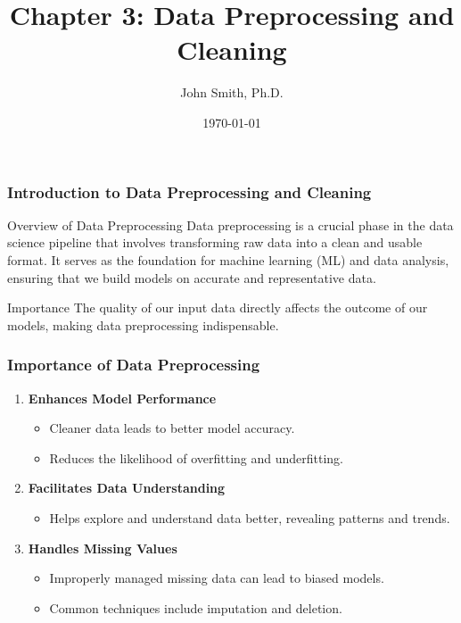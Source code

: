 \documentclass[aspectratio=169]{beamer}
\title[Chapter 3: Data Preprocessing and Cleaning]{Chapter 3: Data Preprocessing and Cleaning}
\author[J. Smith]{John Smith, Ph.D.}
\institute[University Name]{
  Department of Computer Science\\
  University Name\\
  \vspace{0.3cm}
  Email: email@university.edu\\
  Website: www.university.edu
}
\date{\today}
\begin{document}
\frame{\titlepage}

\begin{frame}[fragile]
    \frametitle{Introduction to Data Preprocessing and Cleaning}
    \begin{block}{Overview of Data Preprocessing}
        Data preprocessing is a crucial phase in the data science pipeline that involves transforming raw data into a clean and usable format. 
        It serves as the foundation for machine learning (ML) and data analysis, ensuring that we build models on accurate and representative data.
    \end{block}

    \begin{block}{Importance}
        The quality of our input data directly affects the outcome of our models, making data preprocessing indispensable.
    \end{block}
\end{frame}

\begin{frame}[fragile]
    \frametitle{Importance of Data Preprocessing}
    \begin{enumerate}
        \item \textbf{Enhances Model Performance}
        \begin{itemize}
            \item Cleaner data leads to better model accuracy.
            \item Reduces the likelihood of overfitting and underfitting.
        \end{itemize}
        \item \textbf{Facilitates Data Understanding}
        \begin{itemize}
            \item Helps explore and understand data better, revealing patterns and trends.
        \end{itemize}
        \item \textbf{Handles Missing Values}
        \begin{itemize}
            \item Improperly managed missing data can lead to biased models.
            \item Common techniques include imputation and deletion.
        \end{itemize}
    \end{enumerate}
\end{frame}
\end{document}
